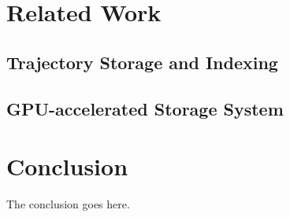 \documentclass[conference]{IEEEtran}
\begin{document}
%



\section{Related Work}
\subsection{Trajectory Storage and Indexing}
\subsection{GPU-accelerated Storage System}


\section{Conclusion}
The conclusion goes here.





\end{document}
